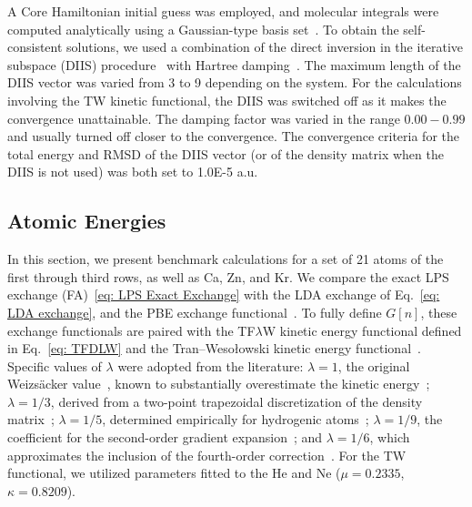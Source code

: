 \documentclass[%
 reprint,
 amsmath,amssymb,
 aps,
pra,
]{revtex4-2}
\begin{document}
A Core Hamiltonian initial guess was employed, and molecular integrals were computed analytically using a Gaussian-type basis set~\cite{Szabo.2012.modern}. To obtain the self-consistent solutions, we used a combination of the direct inversion in the iterative subspace (DIIS) procedure~\cite{Pulay.1980.CPL.73.393} with Hartree damping~\cite{Hartree.1957.Atomic}. The maximum length of the DIIS vector was varied from 3 to 9 depending on the system. For the calculations involving the TW kinetic functional, the DIIS was switched off as it makes the convergence unattainable. The damping factor was varied in the range $0.00-0.99$ and usually turned off closer to the convergence. The convergence criteria for the total energy and RMSD of the DIIS vector (or of the density matrix when the DIIS is not used) was both set to 1.0E-5 a.u. 


\subsection{Atomic Energies}

In this section, we present benchmark calculations for a set of 21 atoms of the first through third rows, as well as Ca, Zn, and Kr. We compare the exact LPS exchange (FA)~\eqref{eq: LPS Exact Exchange} with the LDA exchange of Eq.~\eqref{eq: LDA exchange}, and the PBE exchange functional~\cite{Perdew.1996.PRL.77.3865, Perdew.1997.PRL.78.1396}. To fully define $G[n]$, these exchange functionals are paired with the TF$\lambda$W kinetic energy functional defined in Eq.~\eqref{eq: TFDLW} and the Tran--Wesołowski kinetic energy functional~\cite{Tran.2002.IJQC.89.441}. Specific values of $\lambda$ were adopted from the literature: $\lambda=1$, the original Weizsäcker value~\cite{Weizsäcker.1935.ZP.96.431}, known to substantially overestimate the kinetic energy~\cite{Acharya.1980.PNAS.77.6978,Ludeña.2002.Reviews}; $\lambda=1/3$, derived from a two-point trapezoidal discretization of the density matrix~\cite{Yang.1986.PRA.34.4586}; $\lambda=1/5$, determined empirically for hydrogenic atoms~\cite{Yonei.1965.JPSJ.20.1051,Tomishima.1966.JPSJ.21.142}; $\lambda=1/9$, the coefficient for the second-order gradient expansion~\cite{Parr.1989.density}; and $\lambda=1/6$, which approximates the inclusion of the fourth-order correction~\cite{Brack.1985.Semiclassical}. For the TW functional, we utilized parameters fitted to the He and Ne ($\mu=0.2335$, $\kappa=0.8209$).
\end{document}

